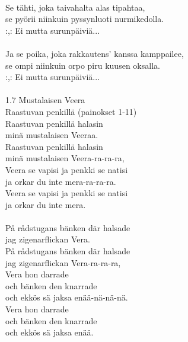 \hspace{10mm} \\
            Se tähti, joka taivahalta alas tipahtaa, \\
            se pyörii niinkuin pyssynluoti nurmikedolla. \\
            :,: Ei mutta surunpäiviä... \\
\hspace{10mm} \\
            Ja se poika, joka rakkautens' kanssa kamppailee, \\
            se ompi niinkuin orpo piru kuusen oksalla. \\
            :,: Ei mutta surunpäiviä... \\
\hspace{10mm} \\
1.7 Mustalaisen Veera \\
Raastuvan penkillä (painokset 1-11) \\
            Raastuvan penkillä halasin \\
            minä mustalaisen Veeraa. \\
            Raastuvan penkillä halasin \\
            minä mustalaisen Veera-ra-ra-ra, \\
            Veera se vapisi ja penkki se natisi \\
            ja orkar du inte mera-ra-ra-ra. \\
            Veera se vapisi ja penkki se natisi \\
            ja orkar du inte mera. \\
\hspace{10mm} \\
            På rådstugans bänken där halsade \\
            jag zigenarflickan Vera. \\
            På rådstugans bänken där halsade \\
            jag zigenarflickan Vera-ra-ra-ra, \\
            Vera hon darrade \\
            och bänken den knarrade \\
            och ekkös sä jaksa enää-nä-nä-nä. \\
            Vera hon darrade \\
            och bänken den knarrade \\
            och ekkös sä jaksa enää. \\
\hspace{10mm} \\
